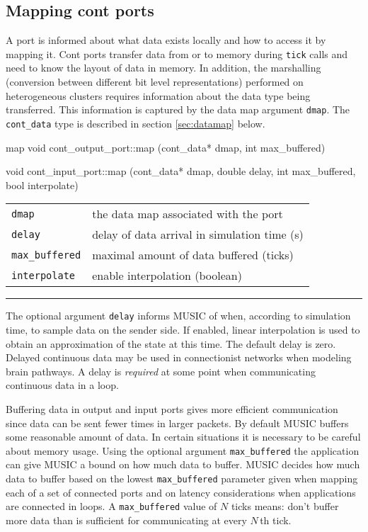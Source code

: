 \documentclass[a4paper]{report}
\makeatletter
\newenvironment{parameters}%
{\begin{tabular}{@{\hspace{2em}}lp{0.6\textwidth}}}%
{\end{tabular}\par\vspace{1mm}\par\hrule\par\vspace{5mm}}
\makeatother
\begin{document}
\subsection{Mapping cont ports}

A port is informed about what data exists locally and how to access it
by mapping it.  Cont ports transfer data from or to memory during
\lstinline|tick| calls and need to know the layout of data in memory.
In addition, the marshalling (conversion between different bit level
representations) performed on heterogeneous clusters requires
information about the data type being transferred.  This information
is captured by the data map argument \lstinline|dmap|.  The
\lstinline|cont_data| type is described in section \ref{sec:datamap}
below.


\begin{head}{map}
  void cont_output_port::map (cont_data* dmap,
                              int max_buffered)

  void cont_input_port::map (cont_data* dmap,
                             double delay,
                             int max_buffered,
                             bool interpolate)
\end{head}
\begin{parameters}
  \lstinline|dmap| & the data map associated with the port \\
  \lstinline|delay| & delay of data arrival in simulation time (s) \\
  \lstinline|max_buffered| & maximal amount of data buffered (ticks)
  \\
  \lstinline|interpolate| & enable interpolation (boolean) \\
\end{parameters}

The optional argument \lstinline|delay| informs MUSIC of when,
according to simulation time, to sample data on the sender side.  If
enabled, linear interpolation is used to obtain an approximation of
the state at this time.  The default delay is zero.  Delayed continuous
data may be used in connectionist networks when modeling brain
pathways.  A delay is \emph{required} at some point when communicating
continuous data in a loop.

Buffering data in output and input ports gives more efficient
communication since data can be sent fewer times in larger packets.
By default MUSIC buffers some reasonable amount of data.  In certain
situations it is necessary to be careful about memory usage.  Using
the optional argument \lstinline|max_buffered| the application can
give MUSIC a bound on how much data to buffer.  MUSIC decides how much
data to buffer based on the lowest \lstinline|max_buffered| parameter
given when mapping each of a set of connected ports and on latency
considerations when applications are connected in loops.  A
\lstinline|max_buffered| value of \(N\) ticks means: don't buffer more
data than is sufficient for communicating at every \(N\)\,th tick.
\end{document}
